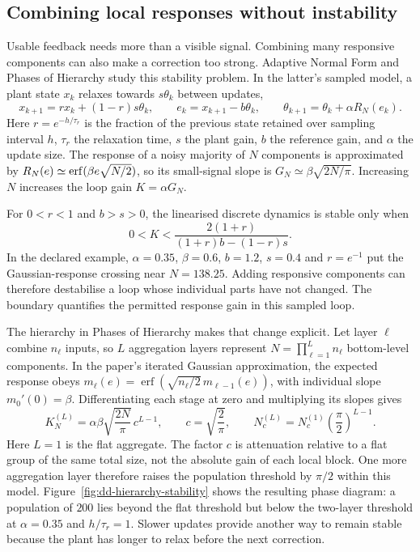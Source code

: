 \subsection{Combining local responses without instability}
Usable feedback needs more than a visible signal. Combining many responsive components can also make a correction too strong. Adaptive Normal Form and Phases of Hierarchy study this stability problem. In the latter's sampled model, a plant state $x_k$ relaxes towards $s\theta_k$ between updates,
\[
 x_{k+1}=r x_k+(1-r)s\theta_k,\qquad
 e_k=x_{k+1}-b\theta_k,\qquad
 \theta_{k+1}=\theta_k+\alpha R_N(e_k).
\]
Here $r=e^{-h/\tau_r}$ is the fraction of the previous state retained over sampling interval $h$, $\tau_r$ the relaxation time, $s$ the plant gain, $b$ the reference gain, and $\alpha$ the update size. The response of a noisy majority of $N$ components is approximated by
$R_N(e)\simeq{\rm erf}(\beta e\sqrt{N/2})$, so its small-signal slope is $G_N\simeq\beta\sqrt{2N/\pi}$. Increasing $N$ increases the loop gain $K=\alpha G_N$.

For $0<r<1$ and $b>s>0$, the linearised discrete dynamics is stable only when
\begin{equation}
 0<K<
 \frac{2(1+r)}{(1+r)b-(1-r)s}.
 \label{eq:feedback-bound}
\end{equation}
In the declared example, $\alpha=0.35$, $\beta=0.6$, $b=1.2$, $s=0.4$ and $r=e^{-1}$ put the Gaussian-response crossing near $N=138.25$. Adding responsive components can therefore destabilise a loop whose individual parts have not changed. The boundary quantifies the permitted response gain in this sampled loop.~\cite{McCaul630942}

The hierarchy in Phases of Hierarchy makes that change explicit. Let layer $\ell$ combine $n_\ell$ inputs, so $L$ aggregation layers represent $N=\prod_{\ell=1}^L n_\ell$ bottom-level components. In the paper's iterated Gaussian approximation, the expected response obeys $m_\ell(e)=\operatorname{erf}(\sqrt{n_\ell/2}\,m_{\ell-1}(e))$, with individual slope $m_0'(0)=\beta$. Differentiating each stage at zero and multiplying its slopes gives
\begin{equation}
 K_N^{(L)}=\alpha\beta\sqrt{\frac{2N}{\pi}}\,c^{L-1},
 \qquad c=\sqrt{\frac{2}{\pi}},
 \qquad
 N_c^{(L)}=N_c^{(1)}\left(\frac{\pi}{2}\right)^{L-1}.
 \label{eq:hierarchy-stability}
\end{equation}
Here $L=1$ is the flat aggregate. The factor $c$ is attenuation relative to a flat group of the same total size, not the absolute gain of each local block. One more aggregation layer therefore raises the population threshold by $\pi/2$ within this model. Figure~\ref{fig:dd-hierarchy-stability} shows the resulting phase diagram: a population of $200$ lies beyond the flat threshold but below the two-layer threshold at $\alpha=0.35$ and $h/\tau_r=1$. Slower updates provide another way to remain stable because the plant has longer to relax before the next correction.~\cite{McCaul630942}

